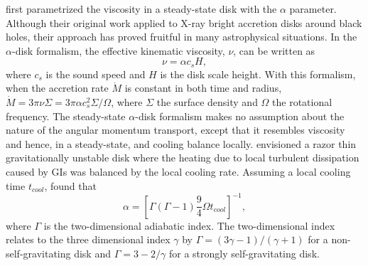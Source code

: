 \citet{shakura1973} first parametrized the viscosity in a steady-state disk with the $\alpha$ parameter. Although their original work applied to X-ray bright accretion disks around black holes, their approach has proved fruitful in many astrophysical situations. In the $\alpha$-disk formalism, the effective kinematic viscosity, $\nu$, can be written as
\begin{equation}
\nu = \alpha c_s H,
\end{equation}
where $c_s$ is the sound speed and $H$ is the disk scale height. With this formalism, when the accretion rate $\dot{M}$ is constant in both time and radius, $\dot{M} = 3\pi\nu\Sigma = 3\pi \alpha c_s^2 \Sigma / \Omega$, where $\Sigma$ the surface density and $\Omega$ the rotational frequency. The steady-state $\alpha$-disk formalism makes no assumption about the nature of the angular momentum transport, except that it resembles viscosity and hence, in a steady-state, and cooling balance locally. \citet{gammie2001} envisioned a razor thin gravitationally unstable disk where the heating due to local turbulent dissipation caused by GIs was balanced by the local cooling rate. Assuming a local cooling time $t_{cool} $, \citeauthor{gammie2001} found that
\begin{equation}
\alpha = [\Gamma (\Gamma -1)\frac{9}{4} \Omega t_{cool}]^{-1},
\label{eq:IC:gammiealpha}
\end{equation}
where $\Gamma$ is the two-dimensional adiabatic index. The two-dimensional index relates to the three dimensional index $\gamma$ by $\Gamma = (3\gamma -1)/(\gamma +1)$ for a non-self-gravitating disk and $\Gamma = 3 - 2/\gamma$ for a strongly self-gravitating disk.

